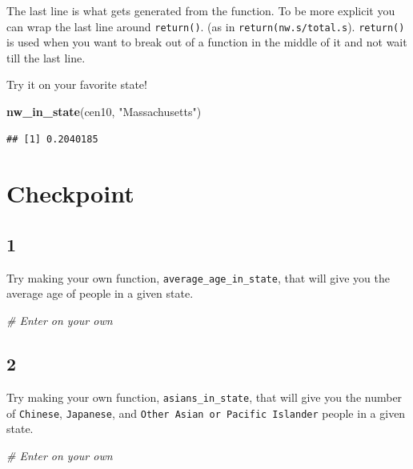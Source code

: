 \documentclass[]{book}
\newenvironment{Shaded}{\begin{snugshade}}{\end{snugshade}}
\newcommand{\CommentTok}[1]{\textcolor[rgb]{0.56,0.35,0.01}{\textit{#1}}}
\newcommand{\KeywordTok}[1]{\textcolor[rgb]{0.13,0.29,0.53}{\textbf{#1}}}
\newcommand{\NormalTok}[1]{#1}
\newcommand{\StringTok}[1]{\textcolor[rgb]{0.31,0.60,0.02}{#1}}
\theoremstyle{definition}
\theoremstyle{definition}
\theoremstyle{definition}
\theoremstyle{remark}
\begin{document}
The last line is what gets generated from the function. To be more explicit you can wrap the last line around \texttt{return()}. (as in \texttt{return(nw.s/total.s}). \texttt{return()} is used when you want to break out of a function in the middle of it and not wait till the last line.

Try it on your favorite state!

\begin{Shaded}
\begin{Highlighting}[]
\KeywordTok{nw_in_state}\NormalTok{(cen10, }\StringTok{"Massachusetts"}\NormalTok{)}
\end{Highlighting}
\end{Shaded}

\begin{verbatim}
## [1] 0.2040185
\end{verbatim}

\hypertarget{checkpoint-1}{%
\section*{Checkpoint}\label{checkpoint-1}}

\hypertarget{section-14}{%
\subsection*{1}\label{section-14}}

Try making your own function, \texttt{average\_age\_in\_state}, that will give you the average age of people in a given state.

\begin{Shaded}
\begin{Highlighting}[]
\CommentTok{# Enter on your own}
\end{Highlighting}
\end{Shaded}

\hypertarget{section-15}{%
\subsection*{2}\label{section-15}}

Try making your own function, \texttt{asians\_in\_state}, that will give you the number of \texttt{Chinese}, \texttt{Japanese}, and \texttt{Other\ Asian\ or\ Pacific\ Islander} people in a given state.

\begin{Shaded}
\begin{Highlighting}[]
\CommentTok{# Enter on your own}
\end{Highlighting}
\end{Shaded}
\end{document}
